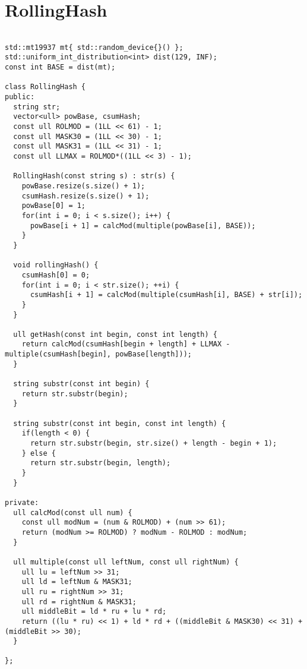 \documentclass{jsarticle}
\begin{document}
\color{white}
\section{RollingHash}
\color{black}
\begin{lstlisting}[caption=RollingHash]

std::mt19937 mt{ std::random_device{}() };
std::uniform_int_distribution<int> dist(129, INF);
const int BASE = dist(mt);

class RollingHash {
public:
  string str;
  vector<ull> powBase, csumHash;
  const ull ROLMOD = (1LL << 61) - 1;
  const ull MASK30 = (1LL << 30) - 1;
  const ull MASK31 = (1LL << 31) - 1;
  const ull LLMAX = ROLMOD*((1LL << 3) - 1);

  RollingHash(const string s) : str(s) {
    powBase.resize(s.size() + 1);
    csumHash.resize(s.size() + 1);
    powBase[0] = 1;
    for(int i = 0; i < s.size(); i++) {
      powBase[i + 1] = calcMod(multiple(powBase[i], BASE));
    }
  }

  void rollingHash() {
    csumHash[0] = 0;
    for(int i = 0; i < str.size(); ++i) {
      csumHash[i + 1] = calcMod(multiple(csumHash[i], BASE) + str[i]);
    }
  }

  ull getHash(const int begin, const int length) {
    return calcMod(csumHash[begin + length] + LLMAX - multiple(csumHash[begin], powBase[length]));
  }

  string substr(const int begin) {
    return str.substr(begin);
  }

  string substr(const int begin, const int length) {
    if(length < 0) {
      return str.substr(begin, str.size() + length - begin + 1);
    } else {
      return str.substr(begin, length);
    }
  }

private:
  ull calcMod(const ull num) {
    const ull modNum = (num & ROLMOD) + (num >> 61);
    return (modNum >= ROLMOD) ? modNum - ROLMOD : modNum;
  }

  ull multiple(const ull leftNum, const ull rightNum) {
    ull lu = leftNum >> 31;
    ull ld = leftNum & MASK31;
    ull ru = rightNum >> 31;
    ull rd = rightNum & MASK31;
    ull middleBit = ld * ru + lu * rd;
    return ((lu * ru) << 1) + ld * rd + ((middleBit & MASK30) << 31) + (middleBit >> 30);
  }

};

\end{lstlisting}

\color{white}
\end{document}
